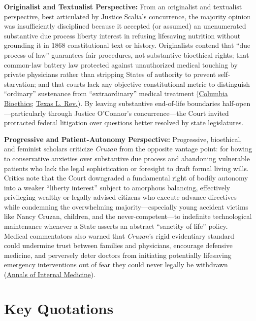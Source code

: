 \documentclass[12pt]{article}
\begin{document}
\textbf{Originalist and Textualist Perspective:} From an originalist and textualist perspective, best articulated by Justice Scalia's concurrence, the majority opinion was insufficiently disciplined because it accepted (or assumed) an unenumerated substantive due process liberty interest in refusing lifesaving nutrition without grounding it in 1868 constitutional text or history. Originalists contend that ``due process of law'' guarantees fair procedures, not substantive bioethical rights; that common-law battery law protected against unauthorized medical touching by private physicians rather than stripping States of authority to prevent self-starvation; and that courts lack any objective constitutional metric to distinguish ``ordinary'' sustenance from ``extraordinary'' medical treatment (\href{https://journals.library.columbia.edu/index.php/bioethics/article/view/14627}{Columbia Bioethics}; \href{https://texaslawreview.org/wp-content/uploads/2025/02/Faulkner.Printer.pdf}{Texas L. Rev.}). By leaving substantive end-of-life boundaries half-open---particularly through Justice O'Connor's concurrence---the Court invited protracted federal litigation over questions better resolved by state legislatures.

\textbf{Progressive and Patient-Autonomy Perspective:} Progressive, bioethical, and feminist scholars criticize \textit{Cruzan} from the opposite vantage point: for bowing to conservative anxieties over substantive due process and abandoning vulnerable patients who lack the legal sophistication or foresight to draft formal living wills. Critics note that the Court downgraded a fundamental right of bodily autonomy into a weaker ``liberty interest'' subject to amorphous balancing, effectively privileging wealthy or legally advised citizens who execute advance directives while condemning the overwhelming majority---especially young accident victims like Nancy Cruzan, children, and the never-competent---to indefinite technological maintenance whenever a State asserts an abstract ``sanctity of life'' policy. Medical commentators also warned that \textit{Cruzan}'s rigid evidentiary standard could undermine trust between families and physicians, encourage defensive medicine, and perversely deter doctors from initiating potentially lifesaving emergency interventions out of fear they could never legally be withdrawn (\href{https://www.acpjournals.org/doi/10.7326/0003-4819-114-10-895}{Annals of Internal Medicine}).

\section{Key Quotations}
\end{document}
